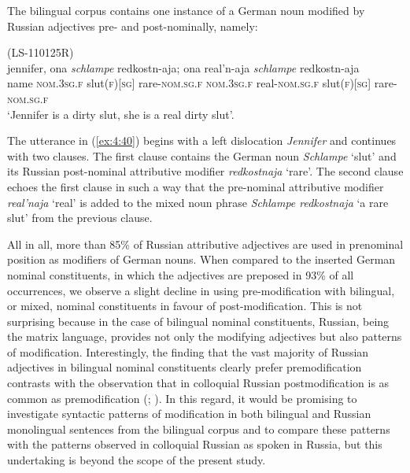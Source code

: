 The bilingual corpus contains one instance of a German noun modified by Russian adjectives pre- and post-nominally, namely:

\ea
\label{ex:4:40}
(LS-110125R)\\
\gll jennifer, ona \textit{schlampe}  redkostn-aja; ona real'n-aja \textit{schlampe}  redkostn-aja\\
	name \textsc{nom.3sg.f} slut(\textsc{f})[\textsc{sg}] rare-\textsc{nom.sg.f} \textsc{nom.3sg.f} real-\textsc{nom.sg.f} slut(\textsc{f})[\textsc{sg}] rare-\textsc{nom.sg.f}\\
\glt `Jennifer is a dirty slut, she is a real dirty slut'.
\z

\noindent The utterance in (\ref{ex:4:40}) begins with a left dislocation \textit{Jennifer} and continues with two clauses. The first clause contains the German noun \textit{Schlampe} `slut' and its Russian post-nominal attributive modifier \textit{redkostnaja} `rare'. The second clause echoes the first clause in such a way that the pre-nominal attributive modifier \textit{real'naja} ‘real’ is added to the mixed noun phrase \textit{Schlampe redkostnaja} `a rare slut' from the previous clause.

All in all, more than 85\% of Russian attributive adjectives are used in prenominal position as modifiers of German nouns. When compared to the inserted German nominal constituents, in which the adjectives are preposed in 93\% of all occurrences, we observe a slight decline in using pre-modification with bilingual, or mixed, nominal constituents in favour of post-modification. This is not surprising because in the case of bilingual nominal constituents, Russian, being the matrix language, provides not only the modifying adjectives but also patterns of modification. Interestingly, the finding that the vast majority of Russian adjectives in bilingual nominal constituents clearly prefer premodification contrasts with the observation that in colloquial Russian postmodification is as common as premodification (\citealt[207]{lapteva}; \citealt[148--149]{zemskaja}). In this regard, it would be promising to investigate syntactic patterns of modification in both bilingual and Russian monolingual sentences from the bilingual corpus and to compare these patterns with the patterns observed in colloquial Russian as spoken in Russia, but this undertaking is beyond the scope of the present study.

